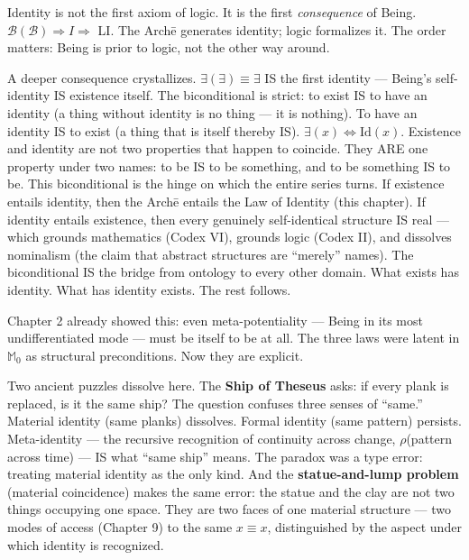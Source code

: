\documentclass[10pt, openany, oneside]{book}
\begin{document}
\noindent Identity is not the first axiom of logic. It is the first \textit{consequence} of Being. $\mathcal{B}(\mathcal{B}) \Rightarrow I \Rightarrow$ LI. The Arch\={e} generates identity; logic formalizes it. The order matters: Being is prior to logic, not the other way around.

A deeper consequence crystallizes. $\exists(\exists) \equiv \exists$ IS the first identity --- Being's self-identity IS existence itself. The biconditional is strict: to exist IS to have an identity (a thing without identity is no thing --- it is nothing). To have an identity IS to exist (a thing that is itself thereby IS). $\exists(x) \iff \text{Id}(x)$. Existence and identity are not two properties that happen to coincide. They ARE one property under two names: to be IS to be something, and to be something IS to be. This biconditional is the hinge on which the entire series turns. If existence entails identity, then the Arch\={e} entails the Law of Identity (this chapter). If identity entails existence, then every genuinely self-identical structure IS real --- which grounds mathematics (Codex VI), grounds logic (Codex II), and dissolves nominalism (the claim that abstract structures are ``merely'' names). The biconditional IS the bridge from ontology to every other domain. What exists has identity. What has identity exists. The rest follows.

Chapter 2 already showed this: even meta-potentiality --- Being in its most undifferentiated mode --- must be itself to be at all. The three laws were latent in $\mathbb{M}_0$ as structural preconditions. Now they are explicit.

Two ancient puzzles dissolve here. The \textbf{Ship of Theseus} asks: if every plank is replaced, is it the same ship? The question confuses three senses of ``same.'' Material identity (same planks) dissolves. Formal identity (same pattern) persists. Meta-identity --- the recursive recognition of continuity across change, $\rho$(pattern across time) --- IS what ``same ship'' means. The paradox was a type error: treating material identity as the only kind. And the \textbf{statue-and-lump problem} (material coincidence) makes the same error: the statue and the clay are not two things occupying one space. They are two faces of one material structure --- two modes of access (Chapter 9) to the same $x \equiv x$, distinguished by the aspect under which identity is recognized.
\end{document}
